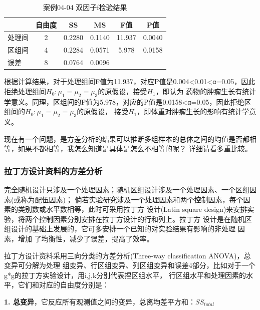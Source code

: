 \documentclass[
]{article}
\begin{document}
\begin{table}

\caption{\label{tab:tab3}案例04-04 双因子f检验结果}
\centering
\begin{tabular}[t]{lccccc}
\toprule
  & 自由度 & SS & MS & F值 & P值\\
\midrule
处理间 & 2 & 0.2280 & 0.1140 & 11.937 & 0.0040\\
区组间 & 4 & 0.2284 & 0.0571 & 5.978 & 0.0158\\
误差 & 8 & 0.0764 & 0.0096 &  & \\
\bottomrule
\end{tabular}
\end{table}

根据计算结果，对于处理组间F值为11.937，对应P值是0.004\textless0.01\textless α=0.05，因此拒绝处理组间\(H_0: μ_1=μ_2=μ_3\)的原假设，接受\(H_1\)，即认为
药物的肿瘤生长有统计学意义。同理，区组间的F值为5.978，对应的P值是0.0158\textless α=0.05，因此拒绝区组间的\(H_0: μ_1=μ_2=μ_3\)的原假设，
接受\(H_1\)，即体重对肿瘤生长的影响有统计学意义。

现在有一个问题，是方差分析的结果可以推断多组样本的总体之间的均值是否都相等，如果不都相等，我怎么知道是具体是怎么不相等的呢？
详细请看\protect\hyperlink{ux591aux4e2aux6837ux672cux5747ux6570ux8bb2ux7684ux591aux91cdux6bd4ux8f83}{多重比较}。

\hypertarget{ux62c9ux4e01ux65b9ux8bbeux8ba1ux8d44ux6599ux7684ux65b9ux5deeux5206ux6790}{%
\subsubsection{拉丁方设计资料的方差分析}\label{ux62c9ux4e01ux65b9ux8bbeux8ba1ux8d44ux6599ux7684ux65b9ux5deeux5206ux6790}}

完全随机设计只涉及一个处理因素；随机区组设计涉及一个处理因素、一个区组因素(或称为配伍因素)；
倘若实验研究涉及一个处理因素和两个控制因素，每个因素的类别数或水平数相等，此时可采用拉丁方
设计(Latin square design)来安排实验，将两个控制因素分别安排在拉丁方设计的行和列上。拉丁方
设计是在随机区组设计的基础上发展的，它可多安排一个已知的对实验结果有影响的非处理 因素，增加
了均衡性，减少了误差，提高了效率。

拉丁方设计资料采用三向分类的方差分析(Three-way classification ANOVA)，总变异可分解为处理
组变异、行区组变异、列区组变异和误差4部分，比如对于一个g*g的拉丁方实验设计，用i,j,k分别代表捏区组水平，
行区组水平和处理因素的水平，它们和对应的自由度分别是：

\textbf{1. 总变异}，它反应所有观测值之间的变异，总离均差平方和：\(SS_{total}\)
\end{document}
